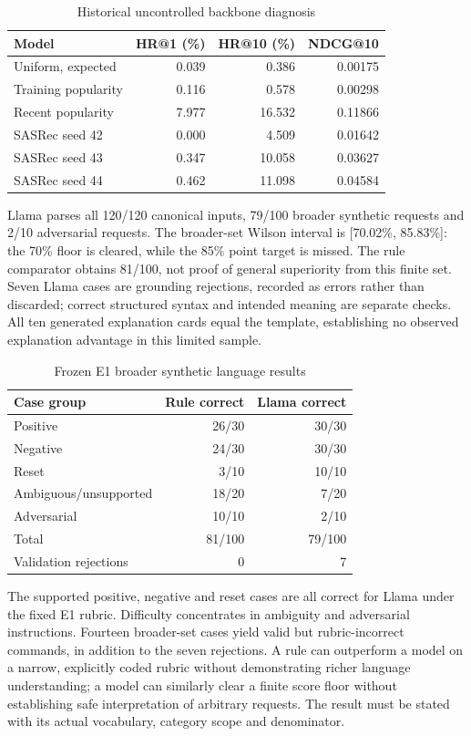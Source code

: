 \documentclass[conference]{IEEEtran}
\begin{document}
\begin{table}[t]\centering\small
\caption{Historical uncontrolled backbone diagnosis}
\setlength{\tabcolsep}{3pt}
\begin{tabular}{lrrr}\toprule
Model&HR@1 (\%)&HR@10 (\%)&NDCG@10\\\midrule
Uniform, expected&0.039&0.386&0.00175\\
Training popularity&0.116&0.578&0.00298\\
Recent popularity&7.977&16.532&0.11866\\
SASRec seed 42&0.000&4.509&0.01642\\
SASRec seed 43&0.347&10.058&0.03627\\
SASRec seed 44&0.462&11.098&0.04584\\\bottomrule
\end{tabular}\end{table}

Llama parses all 120/120 canonical inputs, 79/100 broader synthetic requests and 2/10 adversarial requests. The broader-set Wilson interval is [70.02\%, 85.83\%]: the 70\% floor is cleared, while the 85\% point target is missed. The rule comparator obtains 81/100, not proof of general superiority from this finite set. Seven Llama cases are grounding rejections, recorded as errors rather than discarded; correct structured syntax and intended meaning are separate checks. All ten generated explanation cards equal the template, establishing no observed explanation advantage in this limited sample.

\begin{table}[t]\centering\small
\caption{Frozen E1 broader synthetic language results}
\begin{tabular}{lrr}\toprule
Case group&Rule correct&Llama correct\\\midrule
Positive&26/30&30/30\\
Negative&24/30&30/30\\
Reset&3/10&10/10\\
Ambiguous/unsupported&18/20&7/20\\
Adversarial&10/10&2/10\\\midrule
Total&81/100&79/100\\
Validation rejections&0&7\\\bottomrule
\end{tabular}\end{table}

The supported positive, negative and reset cases are all correct for Llama under the fixed E1 rubric. Difficulty concentrates in ambiguity and adversarial instructions. Fourteen broader-set cases yield valid but rubric-incorrect commands, in addition to the seven rejections. A rule can outperform a model on a narrow, explicitly coded rubric without demonstrating richer language understanding; a model can similarly clear a finite score floor without establishing safe interpretation of arbitrary requests. The result must be stated with its actual vocabulary, category scope and denominator.
\end{document}
